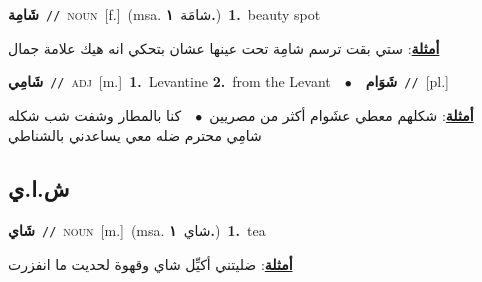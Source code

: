 \documentclass[10pt,a4paper,twoside]{article} %
\begin{document}
\begin{multicols}{2}
{\setlength\topsep{0pt}\textbf{\foreignlanguage{arabic}{شَامِة}}\ {\color{gray}\texttt{//}\color{black}}\ \textsc{noun}\ [f.]\ \color{gray}(msa. \foreignlanguage{arabic}{شامَة}~\foreignlanguage{arabic}{\textbf{١.}})\color{black}\ \textbf{1.}~beauty spot\  \begin{flushright}\color{gray}\foreignlanguage{arabic}{\textbf{\underline{\foreignlanguage{arabic}{أمثلة}}}: ستي بقت ترسم شامِة تحت عينها عشان بتحكي انه هيك علامة جمال}\end{flushright}\color{black}} \vspace{2mm}

{\setlength\topsep{0pt}\textbf{\foreignlanguage{arabic}{شَامِي}}\ {\color{gray}\texttt{//}\color{black}}\ \textsc{adj}\ [m.]\ \textbf{1.}~Levantine  \textbf{2.}~from the Levant\ \ $\bullet$\ \ \setlength\topsep{0pt}\textbf{\foreignlanguage{arabic}{شَوَام}}\ {\color{gray}\texttt{//}\color{black}}\ [pl.]\  \begin{flushright}\color{gray}\foreignlanguage{arabic}{\textbf{\underline{\foreignlanguage{arabic}{أمثلة}}}: شكلهم معطي عشَوام أكثر من مصريين\ $\bullet$\ \  كنا بالمطار وشفت شب شكله شامِي محترم ضله معي يساعدني بالشناطي}\end{flushright}\color{black}} \vspace{2mm}

\vspace{-3mm}
\subsection*{\color{blue}\foreignlanguage{arabic}{ش.ا.ي}\color{blue}{ (ntws)}} 

{\setlength\topsep{0pt}\textbf{\foreignlanguage{arabic}{شَاي}}\ {\color{gray}\texttt{//}\color{black}}\ \textsc{noun}\ [m.]\ \color{gray}(msa. \foreignlanguage{arabic}{شاي}~\foreignlanguage{arabic}{\textbf{١.}})\color{black}\ \textbf{1.}~tea\  \begin{flushright}\color{gray}\foreignlanguage{arabic}{\textbf{\underline{\foreignlanguage{arabic}{أمثلة}}}: ضليتني أكيِّل شاي وقهوة لحديت ما انفزرت}\end{flushright}\color{black}} \vspace{2mm}


\end{multicols}
\end{document}
